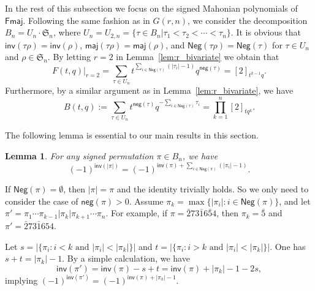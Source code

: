 \documentclass[a4paper, reqno, 11pt]{amsart}
\newtheorem{lem}{Lemma}[section]
\newcommand{\maj}{{\textsf{maj}}}
\newcommand{\inv}{{\textsf{inv}}}
\newcommand{\Nega}{{\textsf{Neg}}}
\newcommand{\nega}{{\textsf{neg}}}
\newcommand{\Fmaj}{{\textsf{Fmaj}}}
\numberwithin{equation}{section}
\def\proof{\noindent{\bf Proof.\quad}}
\begin{document}
In the rest of this subsection we focus on the signed Mahonian polynomials of $\Fmaj$. 
Following the same fashion as in $G(r,n)$, we consider the decomposition $B_n=U_n\cdot\mathfrak{S}_n$, where $U_n=U_{2,n}=\{\tau\in B_n| \tau_1<\tau_2<\cdots<\tau_n\}$.
It is obvious that $\inv(\tau\rho)=\inv(\rho)$, $\maj(\tau\rho)=\maj(\rho)$, and $\Nega(\tau\rho)=\Nega(\tau)$ for $\tau\in U_n$ and $\rho\in\mathfrak{S}_n$.
By letting $r=2$ in Lemma~\ref{lem:r_bivariate} we obtain that
\begin{equation}\label{eq:2_F(t,q)}
F(t,q)\Big|_{r=2} = \sum_{\tau\in U_n}t^{\sum_{i\in\Nega(\tau)}(|\tau_i|-1)}q^{\nega(\tau)} = [2]_{t^{k-1}q}.
\end{equation}
Furthermore, by a similar argument as in Lemma~\ref{lem:r_bivariate}, we have
\begin{equation}\label{eq:B(t,q)}
B(t,q):=\sum_{\tau\in U_n}t^{\nega(\tau)}q^{-\sum_{i\in\Nega(\tau)}\tau_i}=\prod_{k=1}^n[2]_{tq^k}.
\end{equation}












The following lemma is essential to our main results in this section.



























\begin{lem}\label{lem:inv}
For any signed permutation $\pi\in B_n$, we have
$$(-1)^{\inv(|\pi|)}=(-1)^{\inv(\pi)+\sum_{i\in\Nega(\pi)}(|\pi_i|-1)}.$$
\end{lem}
\proof 
If $\Nega(\pi)=\emptyset$, then $|\pi|=\pi$ and the identity trivially holds.
So we only need to consider the case of $\nega(\pi)>0$.
Assume $\pi_k=\max\{|\pi_i| : i\in\Nega(\pi)\}$, and let $\pi'=\pi_1\cdots\pi_{k-1}|\pi_k|\pi_{k+1}\cdots\pi_n$.
For example, if $\pi=\bar{2}73\bar{1}6\bar{5}4$, then $\pi_k=\bar{5}$ and $\pi'=\bar{2}73\bar{1}654$.

Let $s=|\{\pi_i: i<k \text{ and }|\pi_i|<|\pi_k|\}|$ and $t=|\{\pi_i: i>k \text{ and } |\pi_i|<|\pi_k|\}|$. One has $s+t=|\pi_k|-1$.
By a simple calculation, we have
$$\inv(\pi')=\inv(\pi)-s+t=\inv(\pi)+|\pi_k|-1-2s,$$ 
implying $(-1)^{\inv(\pi')}=(-1)^{\inv(\pi)+|\pi_k|-1}.$
\end{document}
